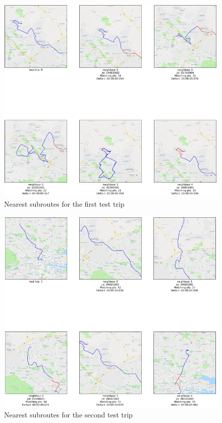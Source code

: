 \documentclass[12pt]{article}
\begin{document}
	\begin{figure} [H]
		\begin{center}
			\includegraphics [scale = 0.80] {subroutes1.png}
			\caption{Nearest subroutes for the first test trip}
		\end{center}
	\end{figure} 
	
	\begin{figure} [H]
		\begin{center}
			\includegraphics [scale = 0.80] {subroutes2.png}
			\caption{Nearest subroutes for the second test trip}
		\end{center}
	\end{figure}
	
\end{document}
